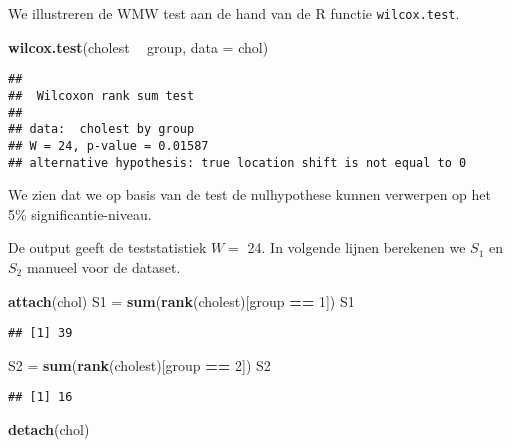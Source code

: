 \documentclass[12pt,dutch,coursenotes]{book}
\newenvironment{Shaded}{\begin{snugshade}}{\end{snugshade}}
\newcommand{\KeywordTok}[1]{\textcolor[rgb]{0.13,0.29,0.53}{\textbf{#1}}}
\newcommand{\DataTypeTok}[1]{\textcolor[rgb]{0.13,0.29,0.53}{#1}}
\newcommand{\DecValTok}[1]{\textcolor[rgb]{0.00,0.00,0.81}{#1}}
\newcommand{\StringTok}[1]{\textcolor[rgb]{0.31,0.60,0.02}{#1}}
\newcommand{\OperatorTok}[1]{\textcolor[rgb]{0.81,0.36,0.00}{\textbf{#1}}}
\newcommand{\NormalTok}[1]{#1}
\theoremstyle{definition}
\theoremstyle{definition}
\theoremstyle{definition}
\theoremstyle{remark}
\begin{document}
We illustreren de WMW test aan de hand van de R functie
\texttt{wilcox.test}.

\begin{Shaded}
\begin{Highlighting}[]
\KeywordTok{wilcox.test}\NormalTok{(cholest }\OperatorTok{~}\StringTok{ }\NormalTok{group, }\DataTypeTok{data =}\NormalTok{ chol)}
\end{Highlighting}
\end{Shaded}

\begin{verbatim}
## 
##  Wilcoxon rank sum test
## 
## data:  cholest by group
## W = 24, p-value = 0.01587
## alternative hypothesis: true location shift is not equal to 0
\end{verbatim}

We zien dat we op basis van de test de nulhypothese kunnen verwerpen op
het 5\% significantie-niveau.

De output geeft de teststatistiek \(W=\) 24. In volgende lijnen
berekenen we \(S_1\) en \(S_2\) manueel voor de dataset.

\begin{Shaded}
\begin{Highlighting}[]
\KeywordTok{attach}\NormalTok{(chol)}
\NormalTok{S1 =}\StringTok{ }\KeywordTok{sum}\NormalTok{(}\KeywordTok{rank}\NormalTok{(cholest)[group }\OperatorTok{==}\StringTok{ }\DecValTok{1}\NormalTok{])}
\NormalTok{S1}
\end{Highlighting}
\end{Shaded}

\begin{verbatim}
## [1] 39
\end{verbatim}

\begin{Shaded}
\begin{Highlighting}[]
\NormalTok{S2 =}\StringTok{ }\KeywordTok{sum}\NormalTok{(}\KeywordTok{rank}\NormalTok{(cholest)[group }\OperatorTok{==}\StringTok{ }\DecValTok{2}\NormalTok{])}
\NormalTok{S2}
\end{Highlighting}
\end{Shaded}

\begin{verbatim}
## [1] 16
\end{verbatim}

\begin{Shaded}
\begin{Highlighting}[]
\KeywordTok{detach}\NormalTok{(chol)}
\end{Highlighting}
\end{Shaded}
\end{document}

